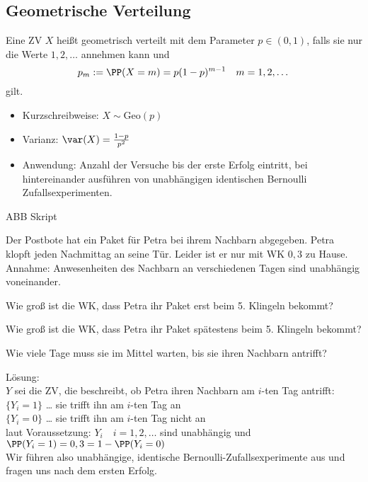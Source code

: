 \subsection{Geometrische Verteilung}
 Eine ZV $X$ heißt geometrisch verteilt mit dem Parameter $p\in (0,1)$, falls sie nur die Werte $1,2,\dots$ annehmen kann und 
$$p_m:=\PP(X=m)=p(1-p)^{m-1} \quad m=1,2,\dots$$
gilt.
\begin{itemize}
\item Kurzschreibweise: $X\sim \mathrm{Geo}(p)$
\item Varianz: $\var(X)=\frac{1-p}{p^2}$
\item Anwendung: Anzahl der Versuche bis der erste Erfolg eintritt, bei hintereinander ausführen von unabhängigen identischen Bernoulli Zufallsexperimenten.
\end{itemize}
ABB Skript

 Der Postbote hat ein Paket für Petra bei ihrem Nachbarn abgegeben. Petra klopft jeden Nachmittag an seine Tür. Leider ist er nur mit WK $0,3$ zu Hause. Annahme: Anwesenheiten des Nachbarn an verschiedenen Tagen sind unabhängig voneinander. 
\begin{anumerate}
\item Wie groß ist die WK, dass Petra ihr Paket erst beim 5. Klingeln bekommt?
\item Wie groß ist die WK, dass Petra ihr Paket spätestens beim 5. Klingeln bekommt?
\item Wie viele Tage muss sie im Mittel warten, bis sie ihren Nachbarn antrifft?
\end{anumerate} 
Lösung:\\
$Y$ sei die ZV, die beschreibt, ob Petra ihren Nachbarn am $i$-ten Tag antrifft:\\
$\{Y_i=1\}$ … sie trifft ihn am $i$-ten Tag an\\
$\{Y_i=0\}$ … sie trifft ihn am $i$-ten Tag nicht an\\
laut Voraussetzung: $Y_i \quad i=1,2, \dots$ sind unabhängig und $\PP(Y_i=1) = 0,3 = 1-\PP(Y_i=0)$\\
Wir führen also unabhängige, identische Bernoulli-Zufallsexperimente aus und fragen uns nach dem ersten Erfolg.


